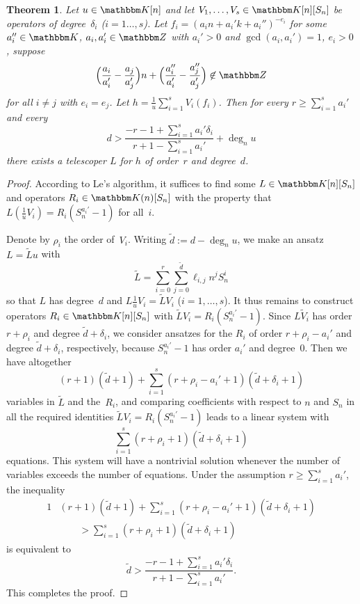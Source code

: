 \documentclass{sig-alternate}
\newtheorem{theorem}{Theorem}
\let\set\mathbbm
\def\K{\set K}
\def\deg{\operatorname{deg}}
\begin{document}
\begin{theorem}\label{thm:curve:rat}
  Let $u\in\K[n]$ and let $V_1,\dots,V_s\in\K[n][S_n]$
  be operators of degree~$\delta_i$ ($i=1\dots,s$).
  Let $f_i=(a_in+a_i'k+a_i'')^{-e_i}$ for some $a_i''\in\K$,
  $a_i,a_i'\in\set Z$ with $a_i'>0$ and $\gcd(a_i,a_i')=1$, $e_i>0$, suppose
  \[
    \Bigl(\frac{a_i}{a_i'} - \frac{a_j}{a_j'}\Bigr)n +
    \Bigl(\frac{a_i''}{a_i'} - \frac{a_j''}{a_j'}\Bigr) \not\in\set Z
  \]
  for all $i\neq j$ with $e_i=e_j$. Let $h=\frac1u\sum_{i=1}^s V_i(f_i)$.
  Then for every $r\geq\sum_{i=1}^s a_i'$ and every
  \[
    d>\frac{\displaystyle-r-1+\sum_{i=1}^s a_i'\delta_i}
           {\displaystyle r+1-\sum_{i=1}^sa_i'} + \deg_n u
  \]
  there exists a telescoper $L$ for $h$ of order~$r$ and degree~$d$.
\end{theorem}
\begin{proof}
  According to Le's algorithm, it suffices to find some $L\in\K[n][S_n]$ and operators
  $R_i\in\K(n)[S_n]$ with the property that $L(\frac1uV_i)= R_i(S_n^{a_i'}-1)$ for all~$i$.

  Denote by $\rho_i$ the order of~$V_i$.  Writing $\tilde d:=d-\deg_n u$, we
  make an ansatz $L=\tilde L u$ with
  \[
   \tilde L=\sum_{i=0}^r \sum_{j=0}^{\tilde d} \ell_{i,j}n^j S_n^i
  \]
  so that $L$ has degree~$d$ and $L \frac1uV_i = \tilde L V_i$ ($i=1,\dots,s$).
  It thus remains to construct operators $R_i\in\K[n][S_n]$ with $\tilde L V_i = R_i(S_n^{a_i'}-1)$.
  Since $L\tilde V_i$ has order $r+\rho_i$ and degree $\tilde d+\delta_i$, we consider
  ansatzes for the $R_i$ of order $r+\rho_i-a_i'$ and degree $\tilde d+\delta_i$, respectively,
  because $S_n^{a_i'}-1$ has order $a_i'$ and degree~$0$.
  Then we have altogether
  \[
    (r+1)(\tilde d+1) + \sum_{i=1}^s (r+\rho_i-a_i'+1)(\tilde d+\delta_i+1)
  \]
  variables in $\tilde L$ and the~$R_i$, and comparing coefficients with respect to $n$ and $S_n$
  in all the required identities $\tilde L V_i=R_i(S_n^{a_i'}-1)$ leads to a linear system with
  \[
    \sum_{i=1}^s (r+\rho_i+1)(\tilde d+\delta_i+1)
  \]
  equations. This system will have a nontrivial solution whenever the number of variables
  exceeds the number of equations. Under the assumption $r\geq\sum_{i=1}^s a_i'$, the inequality
  \begin{alignat*}1
    & (r+1)(\tilde d+1)+ \sum_{i=1}^s (r+\rho_i-a_i'+1)(\tilde d+\delta_i+1) \\
    &\qquad{} > \sum_{i=1}^s (r+\rho_i+1)(\tilde d+\delta_i+1)
  \end{alignat*}
  is equivalent to
  \[
    \tilde d > \frac{-r-1 + \sum_{i=1}^s a_i'\delta_i}{r+1-\sum_{i=1}^sa_i'}.
  \]
  This completes the proof.
\end{proof}
\end{document}

